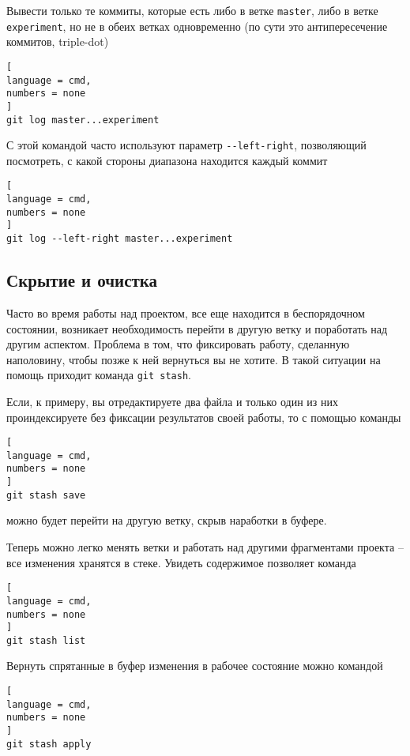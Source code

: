 \documentclass[%
	11pt,
	a4paper,
	utf8,
		]{article}
\begin{document}
Вывести только те коммиты, которые есть либо в ветке \texttt{master}, либо в ветке \texttt{experiment}, но не в обеих ветках одновременно (по сути это антипересечение коммитов, triple-dot)

\begin{lstlisting}[
language = cmd,
numbers = none
]
git log master...experiment
\end{lstlisting}

С этой командой часто используют параметр \lstinline{--left-right}, позволяющий посмотреть, с какой стороны диапазона находится каждый коммит

\begin{lstlisting}[
language = cmd,
numbers = none
]
git log --left-right master...experiment
\end{lstlisting}

\subsection{Скрытие и очистка}

Часто во время работы над проектом, все еще находится в беспорядочном состоянии, возникает необходимость перейти в другую ветку и поработать над другим аспектом. Проблема в том, что фиксировать работу, сделанную наполовину, чтобы позже к ней вернуться вы не хотите. В такой ситуации на помощь приходит команда \texttt{git stash}.

Если, к примеру, вы отредактируете два файла и только один из них проиндексируете без фиксации результатов своей работы, то с помощью команды
\begin{lstlisting}[
language = cmd,
numbers = none
]
git stash save
\end{lstlisting}
можно будет перейти на другую ветку, скрыв наработки в буфере.


Теперь можно легко менять ветки и работать над другими фрагментами проекта -- все изменения хранятся в стеке. Увидеть содержимое позволяет команда

\begin{lstlisting}[
language = cmd,
numbers = none
]
git stash list
\end{lstlisting}

Вернуть спрятанные в буфер изменения в рабочее состояние можно командой

\begin{lstlisting}[
language = cmd,
numbers = none
]
git stash apply
\end{lstlisting}
\end{document}
